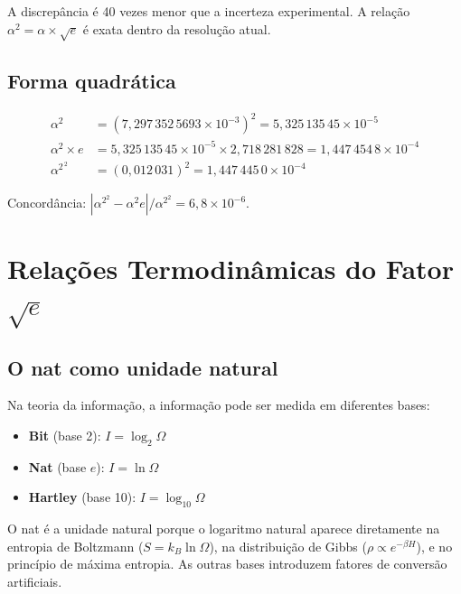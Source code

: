 \documentclass[12pt,a4paper,twoside]{article}
\newcommand{\alphaii}{\alpha^{2}}
\begin{document}
A discrepância é 40 vezes menor que a incerteza experimental. A relação $\alphaii = \alpha \times \sqrt{e}$ é exata dentro da resolução atual.

\subsection{Forma quadrática}

\begin{align}
\alpha^2 &= (7{,}297\,352\,5693 \times 10^{-3})^2 = 5{,}325\,135\,45 \times 10^{-5} \\
\alpha^2 \times e &= 5{,}325\,135\,45 \times 10^{-5} \times 2{,}718\,281\,828 = 1{,}447\,454\,8 \times 10^{-4} \\
\alphaii^{\,2} &= (0{,}012\,031)^2 = 1{,}447\,445\,0 \times 10^{-4}
\end{align}

Concordância: $|\alphaii^2 - \alpha^2 e|/\alphaii^2 = 6{,}8 \times 10^{-6}$.



\section{Relações Termodinâmicas do Fator $\sqrt{e}$}
\label{app:termodinamica}

\subsection{O nat como unidade natural}

Na teoria da informação, a informação pode ser medida em diferentes bases:

\begin{itemize}[nosep]
\item \textbf{Bit} (base 2): $I = \log_2 \Omega$
\item \textbf{Nat} (base $e$): $I = \ln \Omega$
\item \textbf{Hartley} (base 10): $I = \log_{10} \Omega$
\end{itemize}

O nat é a unidade natural porque o logaritmo natural aparece diretamente na entropia de Boltzmann ($S = k_B \ln \Omega$), na distribuição de Gibbs ($\rho \propto e^{-\beta H}$), e no princípio de máxima entropia. As outras bases introduzem fatores de conversão artificiais.
\end{document}
